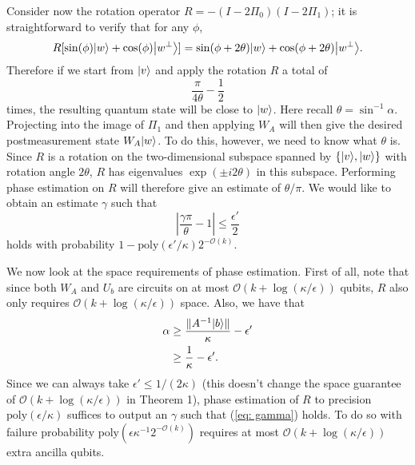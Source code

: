 \documentclass[11pt]{article}
\theoremstyle{definition}
\theoremstyle{remark}
\theoremstyle{definition}
\newcommand\bigoh{\mathcal{O}}
\newcommand{\poly}{\textrm{poly}}
\begin{document}
Consider now the rotation operator $R=-(I-2\Pi_0)(I-2\Pi_1)$; it is straightforward to verify that for any $\phi$,
\begin{equation}
R[\sin(\phi) {\left\vert{w}\right\rangle} + \cos(\phi) {\left\vert{w^\perp}\right\rangle}] = \sin(\phi + 2\theta) {\left\vert{w}\right\rangle} + \cos(\phi + 2\theta) {\left\vert{w^\perp}\right\rangle}.
\end{equation}
Therefore if we start from ${\left\vert{v}\right\rangle}$ and apply the rotation $R$ a total of
\begin{equation}
\frac{\pi}{4\theta} - \frac{1}{2}
\end{equation}
times, the resulting quantum state will be close to ${\left\vert{w}\right\rangle}$. Here recall $\theta = \sin^{-1}\alpha$. Projecting into the image of $\Pi_1$ and then applying $W_A$ will then give the desired postmeasurement state $W_A{\left\vert{w}\right\rangle}$. To do this, however, we need to know what $\theta$ is. Since $R$ is a rotation on the two-dimensional subspace spanned by $\{{\left\vert{v}\right\rangle},{\left\vert{w}\right\rangle}\}$ with rotation angle $2\theta$, $R$ has eigenvalues $\exp(\pm i2\theta)$ in this subspace. Performing phase estimation on $R$ will therefore give an estimate of $\theta/\pi$. We would like to obtain an estimate $\gamma$ such that 
\begin{equation} \label{eq: gamma}
\left|\frac{\gamma\pi}{\theta} - 1\right| \le  \frac{\epsilon'}{2}
\end{equation}
holds with probability $1-\poly(\epsilon' / \kappa)2^{-\mathcal{O}(k)}$.

We now look at the space requirements of phase estimation. First of all, note that since both $W_A$ and $U_b$ are circuits on at most $\bigoh (k + \log(\kappa/\epsilon))$ qubits, $R$ also only requires $\bigoh (k + \log(\kappa/\epsilon))$ space. Also, we have that
\begin{align}
\alpha &\ge \frac{\|A^{-1}{\left\vert{b}\right\rangle}\|}{\kappa} - \epsilon' \\
&\ge \frac{1}{\kappa} - \epsilon'.
\end{align}
Since we can always take $\epsilon' \le 1/(2\kappa)$ (this doesn't change the space guarantee of $\bigoh (k+\log(\kappa/\epsilon))$ in Theorem 1), phase estimation of $R$ to precision $\poly(\epsilon/\kappa)$ suffices to output an $\gamma$ such that (\ref{eq: gamma}) holds. To do so with failure probability $\poly(\epsilon \kappa^{-1}2^{-\mathcal{O}(k)})$ requires at most $\bigoh(k+\log(\kappa/\epsilon))$ extra ancilla qubits.
\end{document}
